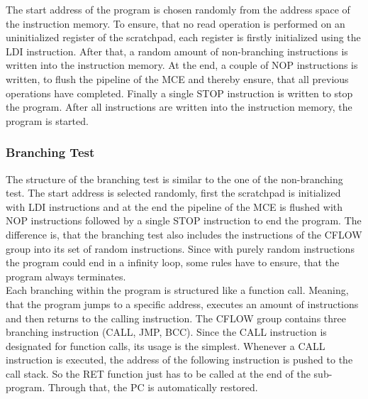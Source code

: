The start address of the program is chosen randomly from the address space of the instruction memory.
To ensure, that no read operation is performed on an uninitialized register of the scratchpad, each register is firstly initialized using the LDI instruction.
After that, a random amount of non-branching instructions is written into the instruction memory.
At the end, a couple of NOP instructions is written, to flush the pipeline of the MCE and thereby ensure, that all previous operations have completed.
Finally a single STOP instruction is written to stop the program.
After all instructions are written into the instruction memory, the program is started.



\subsubsection{Branching Test}

The structure of the branching test is similar to the one of the non-branching test. The start address is selected randomly, first the scratchpad is initialized
with LDI instructions and at the end the pipeline of the MCE is flushed with NOP instructions followed by a single STOP instruction to end the program.
The difference is, that the branching test also includes the instructions of the CFLOW group into its set of random instructions.
Since with purely random instructions the program could end in a infinity loop, some rules have to ensure, that the program always terminates.\\
Each branching within the program is structured like a function call. Meaning, that the program jumps to a specific address, executes an amount of instructions
and then returns to the calling instruction.
The CFLOW group contains three branching instruction (CALL, JMP, BCC). Since the CALL instruction is designated for function calls, its usage is the simplest.
Whenever a CALL instruction is executed, the address of the following instruction is pushed to the call stack. So the RET function just has to be called at the
end of the sub-program. Through that, the PC is automatically restored.\\


